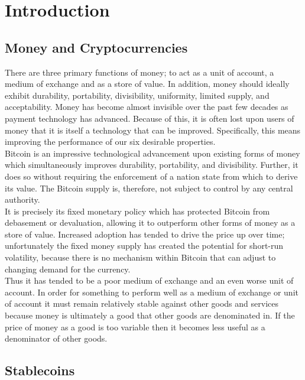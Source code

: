 \section{Introduction}

\subsection{Money and Cryptocurrencies}

There are three primary functions of money; to act as a unit of account, a medium of exchange
and as a store of value. In addition, money should ideally exhibit durability,
portability, divisibility, uniformity, limited supply, and acceptability.
Money has become almost invisible over the past few decades as payment technology has advanced.
Because of this, it is often lost upon users of money that it is itself a technology that can be
improved. Specifically, this means improving the performance of our six desirable properties. \\

\noindent Bitcoin is an impressive technological advancement upon existing forms of money which
simultaneously improves durability, portability, and divisibility.
Further, it does so without requiring the enforcement of a nation state from which to derive its value.
The Bitcoin supply is, therefore, not subject to control by any central authority. \\

\noindent It is precisely its fixed monetary policy which has protected Bitcoin from debasement or
devaluation, allowing it to outperform other forms of money as a store of value. Increased adoption
has tended to drive the price up over time; unfortunately the fixed money supply has created the
potential for short-run volatility, because there is no mechanism within Bitcoin that can
adjust to changing demand for the currency. \\

\noindent Thus it has tended to be a poor medium of exchange and an even worse unit of account.
In order for something to perform well as a medium of exchange or unit of account it must remain
relatively stable against other goods and services because money is ultimately a good that other goods
are denominated in. If the price of money as a good is too variable then it becomes less useful as a
denominator of other goods.

\subsection{Stablecoins}


